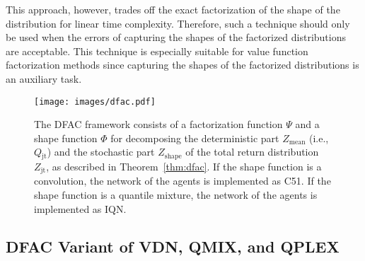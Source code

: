 \documentclass[twoside,11pt]{article}
\newcommand{\utilityexp}{Q}
\newcommand{\utility}{Z}
\newcommand{\joint}{\mathrm{jt}}
\newcommand{\meandecompositionfunction}{\Psi}
\newcommand{\shapedecompositionfunction}{\Phi}
\begin{document}
This approach, however, trades off the exact factorization of the shape of the distribution for linear time complexity. Therefore, such a technique should only be used when the errors of capturing the shapes of the factorized distributions are acceptable. This technique is especially suitable for value function factorization methods since capturing the shapes of the factorized distributions is an auxiliary task.

\begin{figure*}[t]
\texttt{[image: images/dfac.pdf]}
\caption{The DFAC framework consists of a factorization function $\meandecompositionfunction{}$ and a shape function $\shapedecompositionfunction$ for decomposing the deterministic part $\utility{}_{\text{mean}}$ (i.e., $\utilityexp{}_{\joint{}}$) and the stochastic part $\utility{}_{\text{shape}}$ of the total return distribution $\utility{}_{\joint{}}$, as described in Theorem~\ref{thm:dfac}. If the shape function is a convolution, the network of the agents is implemented as C51. If the shape function is a quantile mixture, the network of the agents is implemented as IQN.
}
\label{fig:dfac}
\end{figure*}
 


\subsection{DFAC Variant of VDN, QMIX, and QPLEX}
\label{subsec:methodology_distributional_variant_of_vdn_and_qmix}
\end{document}
